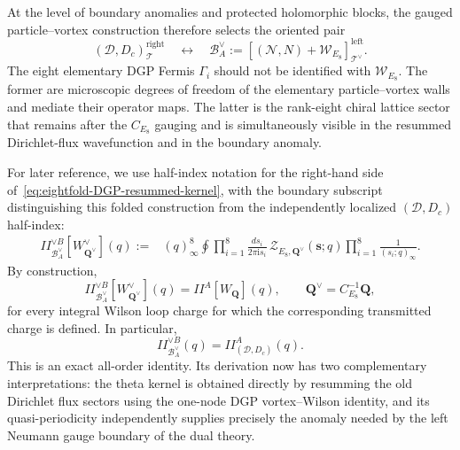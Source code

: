 \documentclass[11pt,a4paper]{article}
\numberwithin{equation}{section}
\begin{document}
At the level of boundary anomalies and protected holomorphic blocks, the gauged particle--vortex construction therefore selects the oriented pair
\begin{equation}
  (\mathcal D,D_c)_{\mathcal T}^{\mathrm{right}}
  \quad\longleftrightarrow\quad
  \mathcal B_A^\vee
  :=
  \left[(\mathcal N,N)+\mathcal W_{E_8}\right]_{\mathcal T^\vee}^{\mathrm{left}}.
  \label{eq:oriented-boundary-pair-A}
\end{equation}
The eight elementary DGP Fermis $\Gamma_i$ should not be identified with $\mathcal W_{E_8}$.  The former are microscopic degrees of freedom of the elementary particle--vortex walls and mediate their operator maps.  The latter is the rank-eight chiral lattice sector that remains after the $C_{E_8}$ gauging and is simultaneously visible in the resummed Dirichlet-flux wavefunction and in the boundary anomaly.

For later reference, we use half-index notation for the right-hand side of~\eqref{eq:eightfold-DGP-resummed-kernel}, with the boundary subscript distinguishing this folded construction from the independently localized $(\mathcal D,D_c)$ half-index:
\begin{equation}
\begin{aligned}
  I\!\!I_{\mathcal B_A^\vee}^{\vee B}
  [W^\vee_{\boldsymbol Q^\vee}](q)
  :={}&
  (q)_\infty^8
  \oint
  \prod_{i=1}^8\frac{ds_i}{2\pi \mathrm{i} s_i}\,
  \mathcal Z_{E_8,\boldsymbol Q^\vee}(\boldsymbol s;q)
  \prod_{i=1}^8\frac1{(s_i;q)_\infty}.
  \label{eq:E8-enriched-Neumann-half-index}
\end{aligned}
\end{equation}
By construction,
\begin{equation}
  I\!\!I_{\mathcal B_A^\vee}^{\vee B}
  [W^\vee_{\boldsymbol Q^\vee}](q)
  =I\!\!I^{A}[W_{\boldsymbol Q}](q),
  \qquad
  \boldsymbol Q^\vee=C_{E_8}^{-1}\boldsymbol Q,
  \label{eq:mirror-half-index-A-exact}
\end{equation}
for every integral Wilson loop charge for which the corresponding transmitted charge is defined.  In particular,
\begin{equation}
  I\!\!I_{\mathcal B_A^\vee}^{\vee B}(q)
  =I\!\!I_{(\mathcal D,D_c)}^{A}(q).
  \label{eq:mirror-half-index-A-vacuum}
\end{equation}
This is an exact all-order identity.  Its derivation now has two complementary interpretations: the theta kernel is obtained directly by resumming the old Dirichlet flux sectors using the one-node DGP vortex--Wilson identity, and its quasi-periodicity independently supplies precisely the anomaly needed by the left Neumann gauge boundary of the dual theory.
\end{document}

